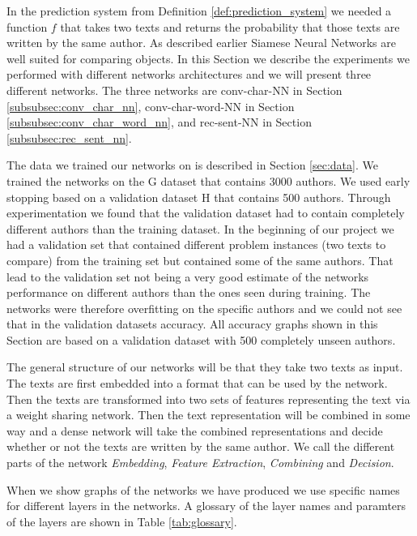 In the prediction system from Definition \ref{def:prediction_system} we needed
a function $f$ that takes two texts and returns the probability that those
texts are written by the same author. As described earlier Siamese Neural
Networks are well suited for comparing objects. In this Section we describe
the experiments we performed with different networks architectures and we
will present three different networks. The three networks are \gls{conv-char-NN}
in Section \ref{subsubsec:conv_char_nn}, \gls{conv-char-word-NN} in Section
\ref{subsubsec:conv_char_word_nn}, and \gls{rec-sent-NN} in Section
\ref{subsubsec:rec_sent_nn}.

The data we trained our networks on is described in Section \ref{sec:data}. We
trained the networks on the G dataset that contains 3000 authors. We used early
stopping based on a validation dataset H that contains 500 authors. Through
experimentation we found that the validation dataset had to contain completely
different authors than the training dataset. In the beginning of our project we
had a validation set that contained different problem instances (two texts to
compare) from the training set but contained some of the same authors. That lead
to the validation set not being a very good estimate of the networks performance
on different authors than the ones seen during training. The networks were
therefore overfitting on the specific authors and we could not see that in the
validation datasets accuracy. All accuracy graphs shown in this Section are
based on a validation dataset with 500 completely unseen authors.

The general structure of our networks will be that they take two texts as input.
The texts are first embedded into a format that can be used by the network.
Then the texts are transformed into two sets of features representing the text
via a weight sharing network. Then the text representation will be combined
in some way and a dense network will take the combined representations and
decide whether or not the texts are written by the same author. We call the
different parts of the network \textit{Embedding}, \textit{Feature Extraction},
\textit{Combining} and \textit{Decision}.

When we show graphs of the networks we have produced we use specific names for
different layers in the networks. A glossary of the layer names and paramters of
the layers are shown in Table \ref{tab:glossary}.

